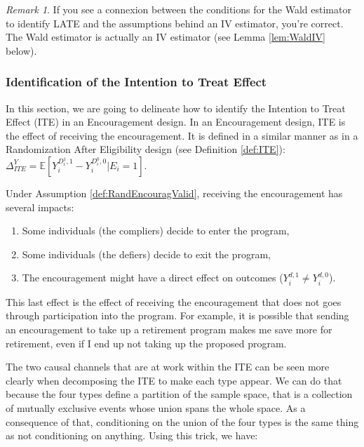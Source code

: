 \documentclass[
]{book}
\providecommand{\tightlist}{%
  \setlength{\itemsep}{0pt}\setlength{\parskip}{0pt}}
\newcommand{\esp}[1]{\mathbb{E}[ #1 ]}
\theoremstyle{definition}
\theoremstyle{definition}
\theoremstyle{definition}
\theoremstyle{definition}
\theoremstyle{remark}
\newtheorem*{remark}{Remark}
\begin{document}
\begin{remark}
\iffalse{} {Remark. } \fi{}If you see a connexion between the conditions for the Wald estimator to identify LATE and the assumptions behind an IV estimator, you're correct.
The Wald estimator is actually an IV estimator (see Lemma \ref{lem:WaldIV} below).
\end{remark}

\hypertarget{ITEEncourag}{%
\subsubsection{Identification of the Intention to Treat Effect}\label{ITEEncourag}}

In this section, we are going to delineate how to identify the Intention to Treat Effect (ITE) in an Encouragement design.
In an Encouragement design, ITE is the effect of receiving the encouragement.
It is defined in a similar manner as in a Randomization After Eligibility design (see Definition \ref{def:ITE}): \(\Delta^Y_{ITE} = \esp{Y_i^{D_i^1,1}-Y_i^{D_i^0,0}|E_i=1}\).

Under Assumption \ref{def:RandEncouragValid}, receiving the encouragement has several impacts:

\begin{enumerate}
\def\labelenumi{\arabic{enumi}.}
\tightlist
\item
  Some individuals (the compliers) decide to enter the program,
\item
  Some individuals (the defiers) decide to exit the program,
\item
  The encouragement might have a direct effect on outcomes (\(Y_i^{d,1}\neq Y_i^{d,0}\)).
\end{enumerate}

This last effect is the effect of receiving the encouragement that does not goes through participation into the program.
For example, it is possible that sending an encouragement to take up a retirement program makes me save more for retirement, even if I end up not taking up the proposed program.

The two causal channels that are at work within the ITE can be seen more clearly when decomposing the ITE to make each type appear.
We can do that because the four types define a partition of the sample space, that is a collection of mutually exclusive events whose union spans the whole space.
As a consequence of that, conditioning on the union of the four types is the same thing as not conditioning on anything.
Using this trick, we have:
\end{document}

